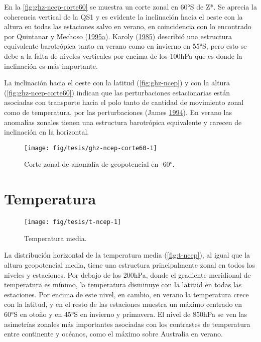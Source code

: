 \documentclass[spanish,a4paper,12p]{book}
\begin{document}
En la \autoref{fig:ghz-ncep-corte60} se muestra un corte zonal en 60°S
de Z*. Se aprecia la coherencia vertical de la QS1 y es evidente la
inclinación hacia el oeste con la altura en todas las estaciones salvo
en verano, en coincidencia con lo encontrado por Quintanar y Mechoso
(\protect\hyperlink{ref-Quintanar1995a}{1995}\protect\hyperlink{ref-Quintanar1995a}{a}).
Karoly (\protect\hyperlink{ref-Karoly1985}{1985}) describió una
estructura equivalente barotrópica tanto en verano como en invierno en
55°S, pero esto se debe a la falta de niveles verticales por encima de
los 100hPa que es donde la inclinación es más importante.

La inclinación hacia el oeste con la latitud (\autoref{fig:ghz-ncep}) y
con la altura (\autoref{fig:ghz-ncep-corte60}) indican que las
perturbaciones estacionarias están asociadas con transporte hacia el
polo tanto de cantidad de movimiento zonal como de temperatura, por las
perturbaciones (James \protect\hyperlink{ref-James}{1994}). En verano
las anomalías zonales tienen una estructura barotrópica equivalente y
carecen de inclinación en la horizontal.

\begin{figure}

{\centering \texttt{[image: fig/tesis/ghz-ncep-corte60-1]} 

}

\caption{Corte zonal de anomalía de geopotencial en -60°.}\label{fig:ghz-ncep-corte60}
\end{figure}

\section{Temperatura}\label{temperatura}

\begin{landscape}\begin{figure}

{\centering \texttt{[image: fig/tesis/t-ncep-1]} 

}

\caption{Temperatura media.}\label{fig:t-ncep}
\end{figure}
\end{landscape}

La distribución horizontal de la temperatura media
(\autoref{fig:t-ncep}), al igual que la altura geopotencial media, tiene
una estructura principalmente zonal en todos los niveles y estaciones.
Por debajo de los 200hPa, donde el gradiente meridional de temperatura
es mínimo, la temperatura disminuye con la latitud en todas las
estaciones. Por encima de este nivel, en cambio, en verano la
temperatura crece con la latitud, y en el resto de las estaciones
muestra un máximo centrado en 60°S en otoño y en 45°S en invierno y
primavera. El nivel de 850hPa se ven las asimetrías zonales más
importantes asociadas con los contrastes de temperatura entre continente
y océanos, como el máximo sobre Australia en verano.
\end{document}
